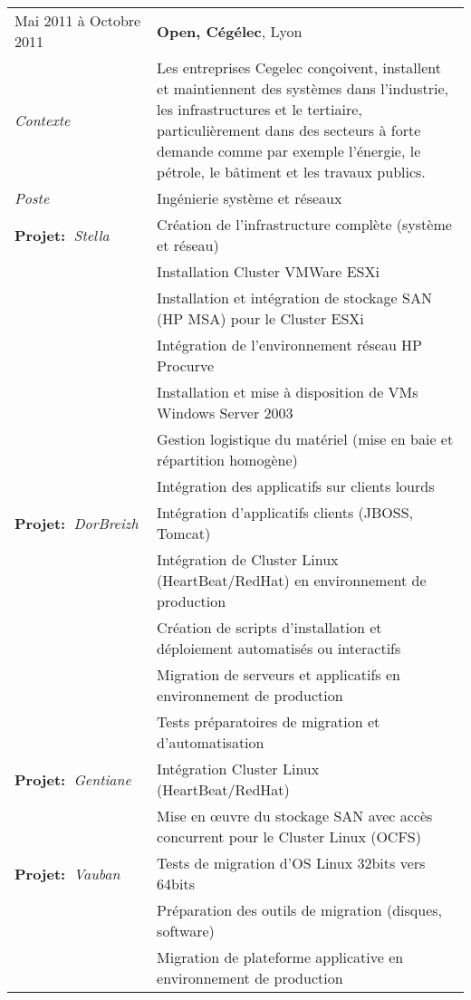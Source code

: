 \documentclass[a4paper,8pt]{article}
\begin{document}
\begin{tabular}{P{3.5cm}|p{13cm}}
Mai 2011 à Octobre 2011		& \textbf{Open, Cégélec}, Lyon\\
\textsl{Contexte}			& Les entreprises Cegelec conçoivent, installent et maintiennent des systèmes dans l’industrie, les infrastructures et le tertiaire, particulièrement dans des secteurs à forte demande comme par exemple l’énergie, le pétrole, le bâtiment et les travaux publics.\\
\textsl{Poste}				& Ingénierie système et réseaux\\
\textbf{Projet:~}\textit{Stella}	& Création de l'infrastructure complète (système et réseau)\\
									& Installation Cluster VMWare ESXi\\
									& Installation et intégration de stockage SAN (HP MSA) pour le Cluster ESXi\\
									& Intégration de l'environnement réseau HP Procurve\\
									& Installation et mise à disposition de VMs Windows Server 2003\\
									& Gestion logistique du matériel (mise en baie et répartition homogène)\\
									& Intégration des applicatifs sur clients lourds\\
\textbf{Projet:~}\textit{DorBreizh}	& Intégration d'applicatifs clients (JBOSS, Tomcat)\\
									& Intégration de Cluster Linux (HeartBeat/RedHat) en environnement de production\\
									& Création de scripts d'installation et déploiement automatisés ou interactifs\\
									& Migration de serveurs et applicatifs en environnement de production\\
									& Tests préparatoires de migration et d'automatisation\\
\textbf{Projet:~}\textit{Gentiane}	& Intégration Cluster Linux (HeartBeat/RedHat)\\
									& Mise en œuvre du stockage SAN avec accès concurrent pour le Cluster Linux (OCFS)\\
\textbf{Projet:~}\textit{Vauban}	& Tests de migration d'OS Linux 32bits vers 64bits\\
									& Préparation des outils de migration (disques, software)\\
									& Migration de plateforme applicative en environnement de production\\

\end{tabular}
\end{document}
